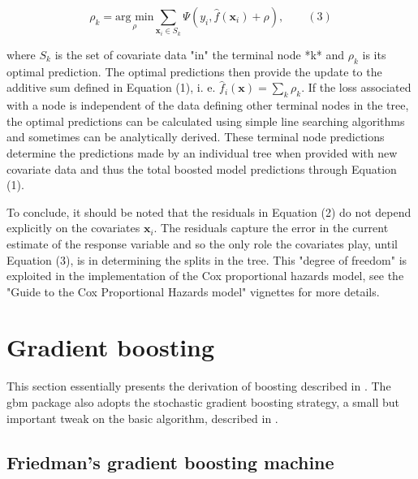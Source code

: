 \documentclass{article}
\begin{document}
$$\rho_k = \underset{\rho}{\text{arg min}} \sum_{\textbf{x}_i \in S_k} \Psi(y_i, \hat{f}(\textbf{x}_i) +\rho),   \qquad (3)$$

where $S_{k}$ is the set of covariate data "in" the terminal node *k* and $\rho_k$ is its optimal prediction.  The optimal predictions then provide the update to the additive sum defined in Equation (1), i. e. $\hat{f}_i(\textbf{x}) = \sum_k \rho_k$.  If the loss associated with a node is independent of the data defining other terminal nodes in the tree, the optimal predictions can be calculated using simple line searching algorithms and sometimes can be analytically derived.  These terminal node predictions determine the predictions made by an individual tree when provided with new covariate data and thus the total boosted model predictions through Equation (1).


To conclude, it should be noted that the residuals in Equation (2) do not depend explicitly on the covariates $\textbf{x}_{i}$.  The residuals capture the error in the current estimate of the response variable and so the only role the covariates play, until Equation (3), is in determining the splits in the tree.  This "degree of freedom" is exploited in the implementation of the Cox proportional hazards model, see the "Guide to the Cox Proportional Hazards model" vignettes for more details.

\section{Gradient boosting}

This section essentially presents the derivation of boosting described
in \cite{Friedman:2001}. The gbm package also adopts the stochastic
gradient boosting strategy, a small but important tweak on the basic
algorithm, described in \cite{Friedman:2002}.

\subsection{Friedman's gradient boosting machine} \label{sec:GradientBoostingMachine}
\end{document}
